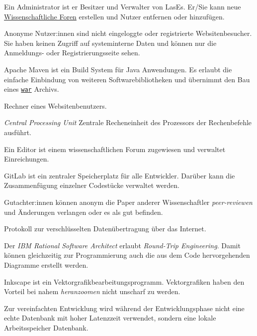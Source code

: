 
\begin{description}
	 Ein Administrator ist er Besitzer und Verwalter von LasEs. Er/Sie kann neue \hyperref[glo:wissForum]{Wissenschaftliche Foren} erstellen und Nutzer entfernen oder hinzufügen.

	 Anonyme Nutzer:innen sind nicht eingeloggte oder registrierte Websitenbesucher. Sie haben keinen Zugriff auf systeminterne Daten und können nur die Anmeldungs- oder Registrierungsseite sehen.

	 Apache Maven ist ein Build System für Java Anwendungen. Es erlaubt die einfache Einbindung von weiteren Softwarebibliotheken und übernimmt den Bau eines \hyperref[glo:war]{\texttt{war}} Archivs.

	 Rechner eines Websitenbenutzers.

	 \emph{Central Processing Unit} Zentrale Recheneinheit des Prozessors der Rechenbefehle ausführt.

	 Ein Editor ist einem wissenschaftlichen Forum zugewiesen und verwaltet Einreichungen.

	 GitLab ist ein zentraler Speicherplatz für alle Entwickler. Darüber kann die Zusammenfügung einzelner Codestücke verwaltet werden.

	 Gutachter:innen können anonym die Paper anderer Wissenschaftler \emph{peer-reviewen} und Änderungen verlangen oder es als gut befinden.

	 Protokoll zur verschlüsselten Datenübertragung über das Internet.

	 Der \emph{IBM Rational Software Architect} erlaubt \emph{Round-Trip Engineering}. Damit können gleichzeitig zur Programmierung auch die aus dem Code hervorgehenden Diagramme erstellt werden.

	 Inkscape ist ein Vektorgrafikbearbeitungsprogramm. Vektorgrafiken haben den Vorteil bei nahem \emph{heranzoomen} nicht unscharf zu werden.

	 Zur vereinfachten Entwicklung wird während der Entwicklungsphase nicht eine echte Datenbank mit hoher Latenzzeit verwendet, sondern eine lokale Arbeitsspeicher Datenbank.


\end{description}
